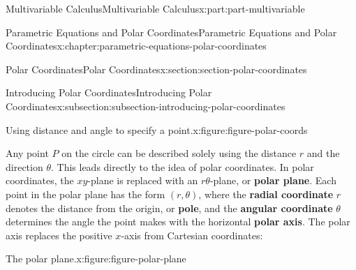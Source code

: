 \documentclass[twoside,10pt,]{tufte-book}
\newcommand{\terminology}[1]{\textbf{#1}}
\numberwithin{equation}{part}
\begin{document}
\begin{partptx}{Multivariable Calculus}{}{Multivariable Calculus}{}{}{x:part:part-multivariable}
\begin{chapterptx}{Parametric Equations and Polar Coordinates}{}{Parametric Equations and Polar Coordinates}{}{}{x:chapter:parametric-equations-polar-coordinates}
\begin{sectionptx}{Polar Coordinates}{}{Polar Coordinates}{}{}{x:section:section-polar-coordinates}
\begin{subsectionptx}{Introducing Polar Coordinates}{}{Introducing Polar Coordinates}{}{}{x:subsection:subsection-introducing-polar-coordinates}
\begin{figureptx}{Using distance and angle to specify a point.}{x:figure:figure-polar-coords}{}%
\begin{image}{0}{1}{0}%
%
\end{image}%
\tcblower
\end{figureptx}%
Any point \(P\) on the circle can be described solely using the distance \(r\) and the direction \(\theta\). This leads directly to the idea of polar coordinates. In polar coordinates, the \(xy\)-plane is replaced with an \(r\theta\)-plane, or \terminology{polar plane}. Each point in the polar plane has the form \((r,\theta)\), where the \terminology{radial coordinate} \(r\) denotes the distance from the origin, or \terminology{pole}, and the \terminology{angular coordinate} \(\theta\) determines the angle the point makes with the horizontal \terminology{polar axis}. The polar axis replaces the positive \(x\)-axis from Cartesian coordinates:%
\begin{figureptx}{The polar plane.}{x:figure:figure-polar-plane}{}%
\begin{image}{0}{1}{0}%
\end{image}
\end{figureptx}
\end{subsectionptx}
\end{sectionptx}
\end{chapterptx}
\end{partptx}
\end{document}
